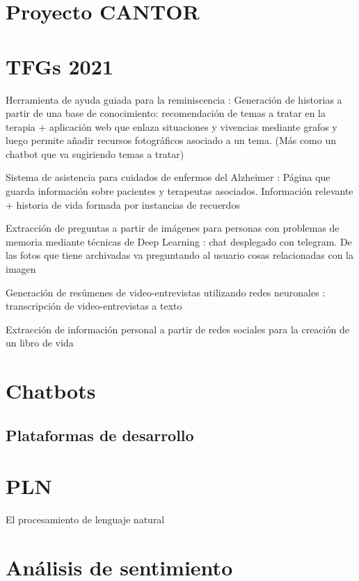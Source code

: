 \section{Proyecto CANTOR}
\citep{cantor}


\section{TFGs 2021}
Herramienta de ayuda guiada para la reminiscencia \citep{reminiscencia} : Generación de historias a partir de una base de conocimiento: recomendación de temas a tratar en la terapia + aplicación web que enlaza situaciones y vivencias mediante grafos y luego permite añadir recursos fotográficos asociado a un tema. (Más como un chatbot que va sugiriendo temas a tratar)

Sistema de asistencia para cuidados de enfermos del Alzheimer \citep{asistencia} : Página que guarda información sobre pacientes y terapeutas asociados. Información relevante + historia de vida formada por instancias de recuerdos

Extracción de preguntas a partir de imágenes para personas con problemas de memoria mediante técnicas de Deep Learning \citep{preguntas} : chat desplegado con telegram. De las fotos que tiene archivadas va preguntando al usuario cosas relacionadas con la imagen

Generación de resúmenes de video-entrevistas utilizando redes neuronales \citep{resumen} : transcripción de video-entrevistas a texto

Extracción de información personal a partir de redes sociales para la creación de un libro de vida \citep{rrss}

\section{Chatbots}


\subsection{Plataformas de desarrollo}


\section{PLN}
El procesamiento de lenguaje natural

\section{Análisis de sentimiento}


